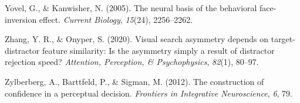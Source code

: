 \documentclass[12pt,twoside]{reedthesis}
\newenvironment{CSLReferences}%
  {}%
  {\par}
\begin{document}
\begin{CSLReferences}{1}{0}
\leavevmode\hypertarget{ref-yovel2005neural}{}%
Yovel, G., \& Kanwisher, N. (2005). The neural basis of the behavioral face-inversion effect. \emph{Current Biology}, \emph{15}(24), 2256--2262.

\leavevmode\hypertarget{ref-zhang2020visual}{}%
Zhang, Y. R., \& Onyper, S. (2020). Visual search asymmetry depends on target-distractor feature similarity: Is the asymmetry simply a result of distractor rejection speed? \emph{Attention, Perception, \& Psychophysics}, \emph{82}(1), 80--97.

\leavevmode\hypertarget{ref-zylberberg2012construction}{}%
Zylberberg, A., Barttfeld, P., \& Sigman, M. (2012). The construction of confidence in a perceptual decision. \emph{Frontiers in Integrative Neuroscience}, \emph{6}, 79.

\end{CSLReferences}

\end{document}
